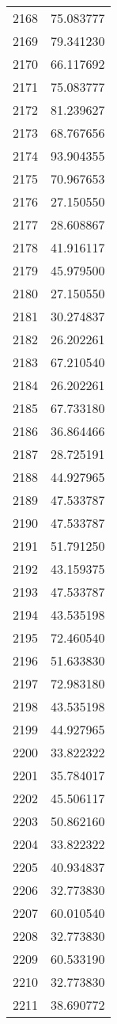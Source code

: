 \documentclass[12pt]{article}
\begin{document}
\begin{longtable}{@{}cc@{}}
2168 & 75.083777 \\
2169 & 79.341230 \\
2170 & 66.117692 \\
2171 & 75.083777 \\
2172 & 81.239627 \\
2173 & 68.767656 \\
2174 & 93.904355 \\
2175 & 70.967653 \\
2176 & 27.150550 \\
2177 & 28.608867 \\
2178 & 41.916117 \\
2179 & 45.979500 \\
2180 & 27.150550 \\
2181 & 30.274837 \\
2182 & 26.202261 \\
2183 & 67.210540 \\
2184 & 26.202261 \\
2185 & 67.733180 \\
2186 & 36.864466 \\
2187 & 28.725191 \\
2188 & 44.927965 \\
2189 & 47.533787 \\
2190 & 47.533787 \\
2191 & 51.791250 \\
2192 & 43.159375 \\
2193 & 47.533787 \\
2194 & 43.535198 \\
2195 & 72.460540 \\
2196 & 51.633830 \\
2197 & 72.983180 \\
2198 & 43.535198 \\
2199 & 44.927965 \\
2200 & 33.822322 \\
2201 & 35.784017 \\
2202 & 45.506117 \\
2203 & 50.862160 \\
2204 & 33.822322 \\
2205 & 40.934837 \\
2206 & 32.773830 \\
2207 & 60.010540 \\
2208 & 32.773830 \\
2209 & 60.533190 \\
2210 & 32.773830 \\
2211 & 38.690772 \\

\end{longtable}
\end{document}
